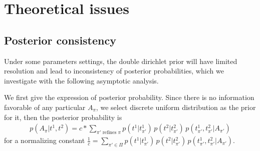\documentclass[aoas,preprint]{imsart}
\begin{document}
\section{Theoretical issues}
\subsection{Posterior consistency}
Under some parameters settings, the double dirichlet prior will have limited resolution and lead to inconsistency of posterior probabilities, which we investigate with the following asymptotic analysis.

We first give the expression of posterior probability. Since there is no information favorable of any particular $A_\pi$, we select discrete uniform distribution as the prior for it, then the posterior probability is
\begin{align}
p(A_\pi | t^1, t^2) = c*\sum_{\pi' \text{ refines } \pi} p(t^1 | t^1_{\pi'})\, p(t^2 |  t^2_{\pi'} )
 \, p( t^1_{\pi'}, t^2_{\pi'} | A_{\pi'} )
\end{align}
for a normalizing constant $\frac{1}{c} = \underset{\pi' \in \Pi}\sum p(t^1 | t^1_{\pi'})\, p(t^2|  t^2_{\pi'} )
 \, p( t^1_{\pi'}, t^2_{\pi'} | A_{\pi'} )$.
 
\end{document}
